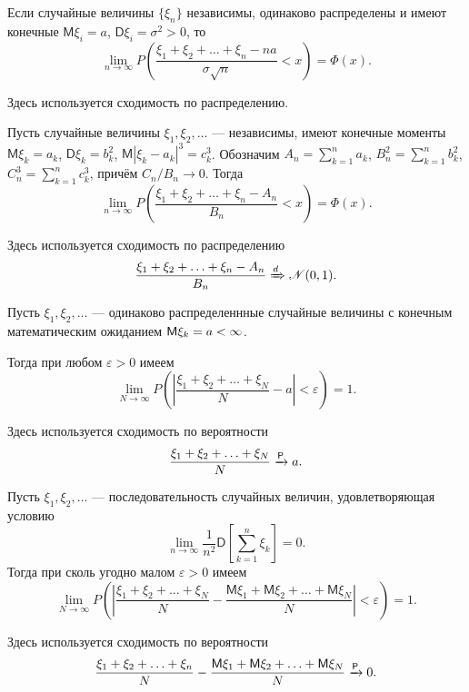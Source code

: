 \begin{theorem}
	Если случайные величины $ \{\xi_n\} $ независимы, одинаково распределены и
	имеют конечные $ \mathsf M\xi_i = a $, $ \mathsf D\xi_i = \sigma^2 > 0 $, то 
	\[
		\lim_{n\to\infty} P \left( \frac{\xi_1 + \xi_2 + \ldots + \xi_n -
		na}{\sigma \sqrt n} < x \right)  = \Phi(x).
	\]
	
	Здесь используется сходимость по распределению.
\end{theorem}
\begin{theorem}[Ляпунов]
Пусть случайные величины $ \xi_1, \xi_2, \ldots $ --- независимы, имеют конечные
моменты $ \mathsf M \xi_k = a_k $, $ \mathsf D\xi_k = b^2_k $, $ \mathsf
M|\xi_k-a_k|^3 = c^3_k $. Обозначим $ A_n = \sum^n_{k=1} a_k $, $ B^2_n =
\sum^n_{k=1} b^2_k $, $ C^3_n = \sum^n_{k=1}c^3_k $, причём $ C_n/B_n \to 0 $.
Тогда 
\[
	\lim_{n\to\infty} P \left( \frac{\xi_1+\xi_2+\ldots+\xi_n-A_n}{B_n} < x
		\right) = \Phi(x).
\]

Здесь используется сходимость по распределению 
\[
		\frac{\xi_1+\xi_2+\ldots+\xi_n-A_n}{B_n} \xRightarrow[]{d} \mathscr N(0,1).
\]
\end{theorem}
\begin{theorem}[Хинчин] 
	Пусть $ \xi_1,\xi_2,\ldots $ --- одинаково распределеннные случайные величины
	с конечным математическим ожиданием $ \mathsf M \xi_k = a < \infty$.

	Тогда при любом $ \varepsilon > 0 $ имеем  
	\[
		\lim_{N\to\infty} P \left( \left| \frac{\xi_1+\xi_2+\ldots+\xi_N}{N} - a
		\right| < \varepsilon \right)  = 1.
	\]
	
	Здесь используется сходимость по вероятности  
	\[
			\frac{\xi_1+\xi_2+\ldots+\xi_N}{N} \xrightarrow[]{\mathsf P} a.
	\]
\end{theorem}
\begin{theorem}[Марков]\label{markov-limit-theorem}
	Пусть $ \xi_1,\xi_2,\ldots $ --- последовательность случайных величин,
	удовлетворяющая условию  
	\[
		\lim_{n\to\infty} \frac{1}{n^2} \mathsf D [\sum_{k=1}^n \xi_k] = 0.
	\]
	Тогда при сколь угодно малом $ \varepsilon > 0 $ имеем 
	\[
		\lim_{N\to\infty} P \left( \left| \frac{\xi_1 + \xi_2 + \ldots + \xi_N}{N} -
		\frac{\mathsf M \xi_1 + \mathsf M\xi_2 + \ldots + \mathsf M \xi_N}{N}\right|
	< \varepsilon \right) = 1.
	\]

Здесь используется сходимость по вероятности  
\[
		\frac{\xi_1 + \xi_2 + \ldots + \xi_n}{N} - \frac{\mathsf M\xi_1 + \mathsf
		M\xi_2 + \ldots + \mathsf M\xi_N}{N} \xrightarrow[]{\mathsf P} 0.
\]	
\end{theorem}

